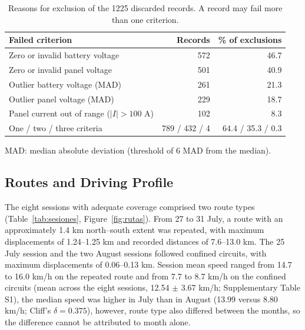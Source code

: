 \documentclass[vehicles,article,submit,moreauthors]{Definitions/mdpi}
\begin{document}
\begin{table}[H]
    \caption{Reasons for exclusion of the 1225 discarded records. A record may fail more than one criterion.\label{tab:exclusion}}
    \small
    \begin{tabular}{l r r}
        \toprule
        \textbf{Failed criterion}                & \textbf{Records} & \textbf{\% of exclusions} \\
        \midrule
        Zero or invalid battery voltage          & 572              & 46.7                      \\
        Zero or invalid panel voltage            & 501              & 40.9                      \\
        Outlier battery voltage (MAD)            & 261              & 21.3                      \\
        Outlier panel voltage (MAD)              & 229              & 18.7                      \\
        Panel current out of range ($|I|>100$ A) & 102              & 8.3                       \\
        \midrule
        One / two / three criteria               & 789 / 432 / 4    & 64.4 / 35.3 / 0.3         \\
        \bottomrule
    \end{tabular}
    \begin{flushleft}
        \footnotesize MAD: median absolute deviation (threshold of 6 MAD from the median).
    \end{flushleft}
\end{table}

\subsection{Routes and Driving Profile}

The eight sessions with adequate coverage comprised two route types (Table~\ref{tab:sesiones}, Figure~\ref{fig:rutas}). From 27 to 31 July, a route with an approximately 1.4 km north--south extent was repeated, with maximum displacements of 1.24--1.25 km and recorded distances of 7.6--13.0 km. The 25 July session and the two August sessions followed confined circuits, with maximum displacements of 0.06--0.13 km. Session mean speed ranged from 14.7 to 16.0 km/h on the repeated route and from 7.7 to 8.7 km/h on the confined circuits (mean across the eight sessions, 12.54 $\pm$ 3.67 km/h; Supplementary Table S1), the median speed was higher in July than in August (13.99 versus 8.80 km/h; Cliff's $\delta=0.375$), however, route type also differed between the months, so the difference cannot be attributed to month alone.
\end{document}
